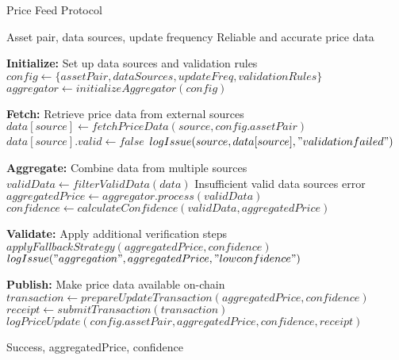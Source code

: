 
\begin{algorithm}
\caption{Price Feed Protocol}
\label{alg:price-feed}
\begin{algorithmic}[1]
\Require Asset pair, data sources, update frequency
\Ensure Reliable and accurate price data

\State \textbf{Initialize:} Set up data sources and validation rules
\State $config \gets \{assetPair, dataSources, updateFreq, validationRules\}$
\State $aggregator \gets initializeAggregator(config)$

\State \textbf{Fetch:} Retrieve price data from external sources
    \State $data[source] \gets fetchPriceData(source, config.assetPair)$
        \State $data[source].valid \gets false$
        \State $logIssue(source, data[source], "validation failed")$
    \EndIf
\EndFor

\State \textbf{Aggregate:} Combine data from multiple sources
\State $validData \gets filterValidData(data)$
    \State \Return Insufficient valid data sources error
\EndIf
\State $aggregatedPrice \gets aggregator.process(validData)$
\State $confidence \gets calculateConfidence(validData, aggregatedPrice)$

\State \textbf{Validate:} Apply additional verification steps
    \State $applyFallbackStrategy(aggregatedPrice, confidence)$
    \State $logIssue("aggregation", aggregatedPrice, "low confidence")$
\EndIf

\State \textbf{Publish:} Make price data available on-chain
\State $transaction \gets prepareUpdateTransaction(aggregatedPrice, confidence)$
\State $receipt \gets submitTransaction(transaction)$
\State $logPriceUpdate(config.assetPair, aggregatedPrice, confidence, receipt)$

\State \Return Success, aggregatedPrice, confidence
\end{algorithmic}
\end{algorithm} 